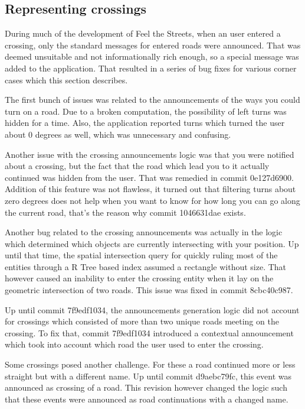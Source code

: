 \documentclass[nolof,digital]{fithesis3}
\begin{document}
\subsection{Representing crossings}
During much of the development of Feel the Streets, when an user entered a crossing, only the standard messages for entered roads were announced. That was deemed unsuitable and not informationally rich enough, so a special message was added to the application. That resulted in a series of bug fixes for various corner cases which this section describes.

The first bunch of issues was related to the announcements of the ways you could turn on a road. Due to a broken computation, the possibility of left turns was hidden for a time. Also, the application reported turns which turned the user about 0 degrees as well, which was unnecessary and confusing.

Another issue with the crossing announcements logic was that you were notified about a crossing, but the fact that the road which lead you to it actually continued was hidden from the user. That was remedied in commit 0e127d6900. Addition of this feature was not flawless, it turned out that filtering turns about zero degrees does not help when you want to know for how long you can go along the current road, that's the reason why commit 1046631dae exists.

Another bug related to the crossing announcements was actually in the logic which determined which objects are currently intersecting with your position. Up until that time, the spatial intersection query for quickly ruling most of the entities through a R Tree based index assumed a rectangle without size. That however caused an inability to enter the crossing entity when it lay on the geometric intersection of two roads. This issue was fixed in commit 8cbc40c987.

Up until commit 7f9edf1034, the announcements generation logic did not account for crossings which consisted of more than two unique roads meeting on the crossing. To fix that, commit 7f9edf1034 introduced a contextual announcement which took into account which road the user used to enter the crossing.

Some crossings posed another challenge. For these a road continued more or less straight but with a different name. Up until commit d9aebc79fc, this event was announced as crossing of a road. This revision however changed the logic such that these events were announced as road continuations with a changed name.
\end{document}
